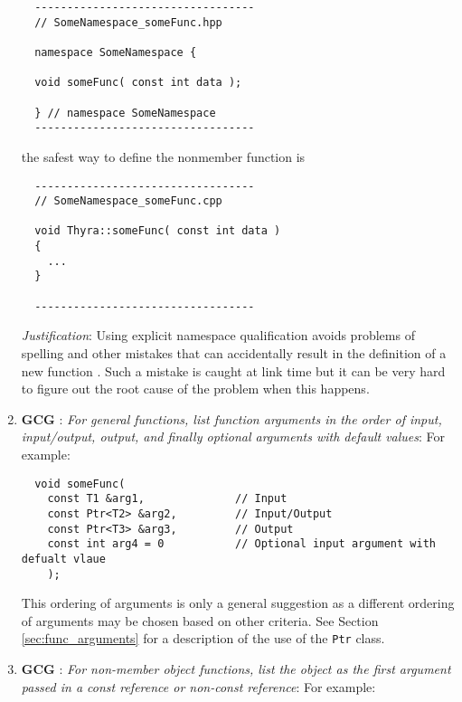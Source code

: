 \begin{enumerate}
{\small\begin{verbatim}
  ----------------------------------
  // SomeNamespace_someFunc.hpp

  namespace SomeNamespace {

  void someFunc( const int data );

  } // namespace SomeNamespace
  ----------------------------------
\end{verbatim}}

the safest way to define the nonmember function is

{\small\begin{verbatim}
  ----------------------------------
  // SomeNamespace_someFunc.cpp

  void Thyra::someFunc( const int data )
  {
    ...
  }

  ----------------------------------
\end{verbatim}}

{}\textit{Justification}: Using explicit namespace qualification avoids
problems of spelling and other mistakes that can accidentally result in the
definition of a new function {}\cite[Section 8.2]{stroustrup97}.  Such a
mistake is caught at link time but it can be very hard to figure out the root
cause of the problem when this happens.

{}\item{}\textbf{GCG }:
{}\textit{For general functions, list function arguments in the order of
input, input/output, output, and finally optional arguments with default
values}: For example:

{\small\begin{verbatim}
  void someFunc(
    const T1 &arg1,              // Input
    const Ptr<T2> &arg2,         // Input/Output
    const Ptr<T3> &arg3,         // Output
    const int arg4 = 0           // Optional input argument with defualt vlaue
    );
\end{verbatim}}

This ordering of arguments is only a general suggestion as a different
ordering of arguments may be chosen based on other criteria.  See Section
{}\ref{sec:func_arguments} for a description of the use of the {}\texttt{Ptr}
class.

{}\item{}\textbf{GCG }:
{}\textit{For non-member object functions, list the object as the first
argument passed in a const reference or non-const reference}: For example:


\end{enumerate}
